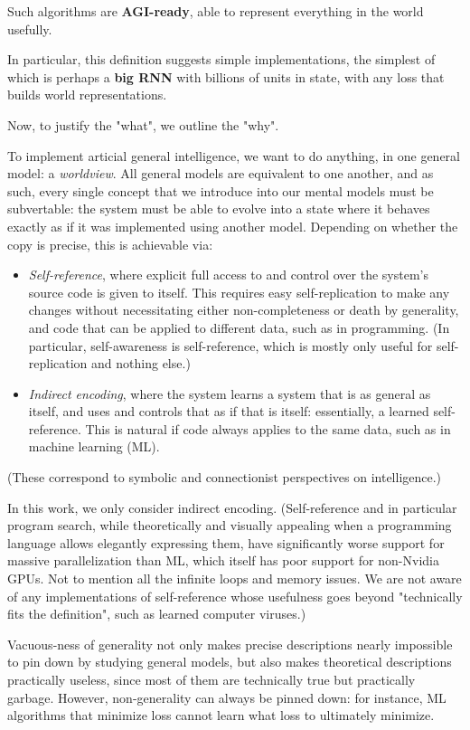\documentclass{article}
\begin{document}
Such algorithms are \textbf{AGI-ready}, able to represent everything in the world usefully.

In particular, this definition suggests simple implementations, the simplest of which is perhaps a \textbf{big RNN} with billions of units in state, with any loss that builds world representations.

Now, to justify the "what", we outline the "why".

To implement articial general intelligence, we want to do anything, in one general model: a \textit{worldview}. All general models are equivalent to one another, and as such, every single concept that we introduce into our mental models must be subvertable: the system must be able to evolve into a state where it behaves exactly as if it was implemented using another model. Depending on whether the copy is precise, this is achievable via:

\begin{itemize}
\item \textit{Self-reference}, where explicit full access to and control over the system's source code is given to itself. This requires easy self-replication to make any changes without necessitating either non-completeness or death by generality, and code that can be applied to different data, such as in programming. (In particular, self-awareness is self-reference, which is mostly only useful for self-replication and nothing else.)
\item \textit{Indirect encoding}, where the system learns a system that is as general as itself, and uses and controls that as if that is itself: essentially, a learned self-reference. This is natural if code always applies to the same data, such as in machine learning (ML).
\end{itemize}

(These correspond to symbolic and connectionist perspectives on intelligence.)

In this work, we only consider indirect encoding. (Self-reference and in particular program search, while theoretically and visually appealing when a programming language allows elegantly expressing them, have significantly worse support for massive parallelization than ML, which itself has poor support for non-Nvidia GPUs. Not to mention all the infinite loops and memory issues. We are not aware of any implementations of self-reference whose usefulness goes beyond "technically fits the definition", such as learned computer viruses.)

Vacuous-ness of generality not only makes precise descriptions nearly impossible to pin down by studying general models, but also makes theoretical descriptions practically useless, since most of them are technically true but practically garbage. However, non-generality can always be pinned down: for instance, ML algorithms that minimize loss cannot learn what loss to ultimately minimize.
\end{document}
